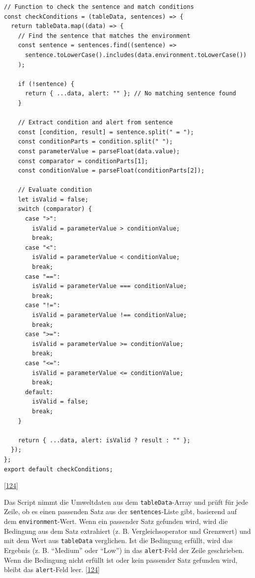 \documentclass[
    headings=optiontotocandhead,%
    twoside,
    numbers=noenddot,%
    12pt, %
    titlepage, %
    parskip=full, %
    listof=leveldown, 
    numbers=noenddot, %
    a4paper,DIV=14,
    BCOR=15mm,
]{scrbook}
\newcommand{\passthrough}[1]{#1}
\renewenvironment{quote}{\begin{customblockquote}\list{}{\rightmargin=0em\leftmargin=0em}%
\item\relax\color{blockquote-text}\ignorespaces}{\unskip\unskip\endlist\end{customblockquote}}
\begin{document}
\begin{lstlisting}[caption={checkConditions des ConditionChecker Skripts}]
// Function to check the sentence and match conditions
const checkConditions = (tableData, sentences) => {
  return tableData.map((data) => {
    // Find the sentence that matches the environment
    const sentence = sentences.find((sentence) =>
      sentence.toLowerCase().includes(data.environment.toLowerCase())
    );

    if (!sentence) {
      return { ...data, alert: "" }; // No matching sentence found
    }

    // Extract condition and alert from sentence
    const [condition, result] = sentence.split(" = ");
    const conditionParts = condition.split(" ");
    const parameterValue = parseFloat(data.value);
    const comparator = conditionParts[1];
    const conditionValue = parseFloat(conditionParts[2]);

    // Evaluate condition
    let isValid = false;
    switch (comparator) {
      case ">":
        isValid = parameterValue > conditionValue;
        break;
      case "<":
        isValid = parameterValue < conditionValue;
        break;
      case "==":
        isValid = parameterValue === conditionValue;
        break;
      case "!=":
        isValid = parameterValue !== conditionValue;
        break;
      case ">=":
        isValid = parameterValue >= conditionValue;
        break;
      case "<=":
        isValid = parameterValue <= conditionValue;
        break;
      default:
        isValid = false;
        break;
    }

    return { ...data, alert: isValid ? result : "" };
  });
};
export default checkConditions;
\end{lstlisting}

{[}\protect\hyperlink{ref-gpt-ConditionsCheckerScript}{124}{]}

\begin{quote}
Das Script nimmt die Umweltdaten aus dem
\passthrough{\lstinline!tableData!}-Array und prüft für jede Zeile, ob
es einen passenden Satz aus der
\passthrough{\lstinline!sentences!}-Liste gibt, basierend auf dem
\passthrough{\lstinline!environment!}-Wert. Wenn ein passender Satz
gefunden wird, wird die Bedingung aus dem Satz extrahiert (z. B.
Vergleichsoperator und Grenzwert) und mit dem Wert aus
\passthrough{\lstinline!tableData!} verglichen. Ist die Bedingung
erfüllt, wird das Ergebnis (z. B. ``Medium'' oder ``Low'') in das
\passthrough{\lstinline!alert!}-Feld der Zeile geschrieben. Wenn die
Bedingung nicht erfüllt ist oder kein passender Satz gefunden wird,
bleibt das \passthrough{\lstinline!alert!}-Feld leer.
{[}\protect\hyperlink{ref-gpt-ConditionsCheckerScript}{124}{]}
\end{quote}
\end{document}
